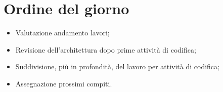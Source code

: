 \documentclass[../verbale-2017-03-20.tex]{subfiles}
\begin{document}
	
\section{Ordine del giorno}
	\begin{itemize}
		\item Valutazione andamento lavori;
		\item Revisione dell'architettura dopo prime attività di codifica;
		\item Suddivisione, più in profondità, del lavoro per attività di codifica;
		\item Assegnazione prossimi compiti.
	\end{itemize}
	
\end{document}
